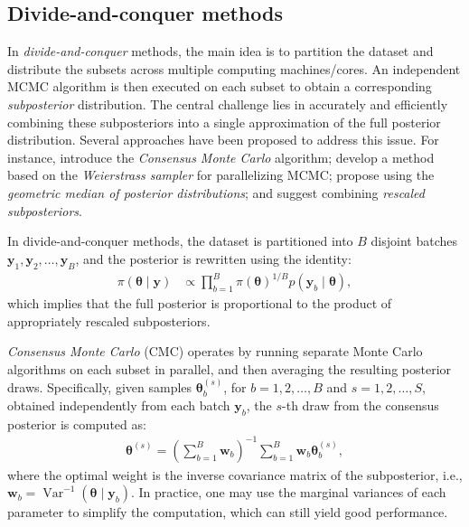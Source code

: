 \subsection{Divide-and-conquer methods}
In \textit{divide-and-conquer} methods, the main idea is to partition the dataset and distribute the subsets across multiple computing machines/cores. An independent MCMC algorithm is then executed on each subset to obtain a corresponding \textit{subposterior} distribution. The central challenge lies in accurately and efficiently combining these subposteriors into a single approximation of the full posterior distribution. Several approaches have been proposed to address this issue. For instance, \cite{huang2005sampling,scott2016bayes, rendell2020global, scott2022bayes} introduce the \textit{Consensus Monte Carlo} algorithm; \cite{wang2013parallelizing} develop a method based on the \textit{Weierstrass sampler} for parallelizing MCMC; \cite{minsker2015scalable} propose using the \textit{geometric median of posterior distributions}; and \cite{wu2017average} suggest combining \textit{rescaled subposteriors}.

In divide-and-conquer methods, the dataset is partitioned into \( B \) disjoint batches \( \mathbf{y}_1, \mathbf{y}_2, \dots, \mathbf{y}_B \), and the posterior is rewritten using the identity:
\begin{align*}
	\pi(\boldsymbol{\theta} \mid \mathbf{y}) &\propto \prod_{b=1}^B \pi(\boldsymbol{\theta})^{1/B} p(\mathbf{y}_b \mid \boldsymbol{\theta}),
\end{align*}
which implies that the full posterior is proportional to the product of appropriately rescaled subposteriors.

\textit{Consensus Monte Carlo} (CMC) operates by running separate Monte Carlo algorithms on each subset in parallel, and then averaging the resulting posterior draws. Specifically, given samples \( \boldsymbol{\theta}_b^{(s)} \), for  \( b = 1, 2, \dots, B \) and \( s = 1, 2, \dots, S \), obtained independently from each batch \( \mathbf{y}_b \), the \( s \)-th draw from the consensus posterior is computed as:
\begin{align*}
	\boldsymbol{\theta}^{(s)} = \left( \sum_{b=1}^B \mathbf{w}_b \right)^{-1} \sum_{b=1}^B \mathbf{w}_b \boldsymbol{\theta}_b^{(s)},
\end{align*}
where the optimal weight is the inverse covariance matrix of the subposterior, i.e., \( \mathbf{w}_b = \operatorname{Var}^{-1}(\boldsymbol{\theta} \mid \mathbf{y}_b) \). In practice, one may use the marginal variances of each parameter to simplify the computation, which can still yield good performance.

